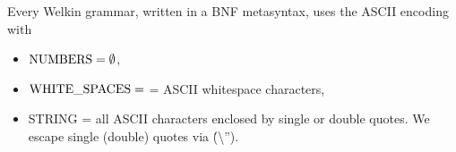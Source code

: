 
Every Welkin grammar, written in a BNF metasyntax, uses the ASCII encoding with
\begin{itemize}
  \item $\mathrm{NUMBERS} = \emptyset$,
  \item $\mathrm{WHITE\_SPACES} = $ = ASCII whitespace characters,
  \item STRING = all ASCII characters enclosed by single or double quotes. We escape single (double) quotes via \' (\textbackslash'').
\end{itemize}


